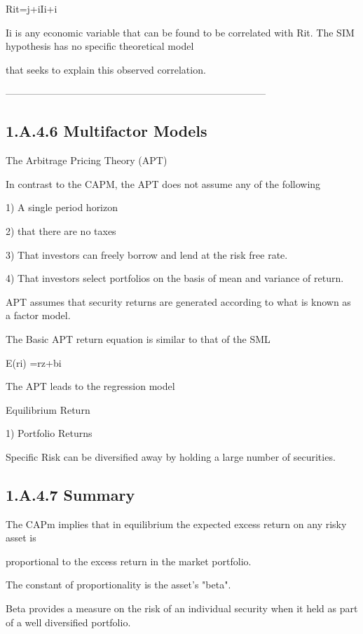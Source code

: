 Rit=j+iIi+i


Ii is any economic variable that can be found to be correlated with Rit. The SIM hypothesis has no specific theoretical model

that seeks to explain this observed correlation.




--------------------------------------------------------------------------------
\subsection{1.A.4.6 Multifactor Models}



The Arbitrage Pricing Theory (APT)


In contrast to the CAPM, the APT does not assume any of the following


1) A single period horizon


2) that there are no taxes


3) That investors can freely borrow and lend at the risk free rate.


4) That investors select portfolios on the basis of mean and variance of return.


APT assumes that security returns are generated according to what is known as a factor model.


The Basic APT return equation is similar to that of the SML


E(ri) =rz+bi




The APT leads to the regression model


Equilibrium Return



1) Portfolio Returns


Specific Risk can be diversified away by holding a large number of securities.

\subsection{1.A.4.7 Summary}

The CAPm  implies that in equilibrium the expected excess return on any risky asset is 

proportional to the excess return in the market portfolio.


The constant of proportionality is the asset's "beta".


Beta provides a measure on the risk of an individual security when it held as part of a well diversified portfolio.



